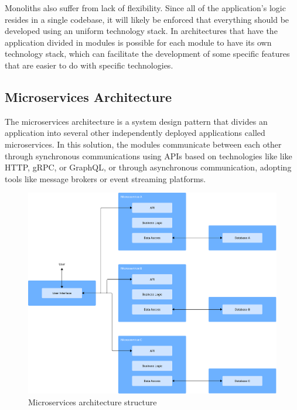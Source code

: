 Monoliths also suffer from lack of flexibility. Since all of the application's
logic resides in a single codebase, it will likely be enforced that everything
should be developed using an uniform technology stack. In architectures that
have the application divided in modules is possible for each module to have
its own technology stack, which can facilitate the development of some specific
features that are easier to do with specific technologies\cite{IBMMonolith}.

\subsection{Microservices Architecture}
The microservices architecture is a system design pattern that divides an
application into several other independently deployed applications called
microservices\cite{7436659}.
In this solution, the modules communicate between each other through
synchronous communications using \gls{API}s based on technologies like like
\gls{HTTP}, \gls{gRPC}, or GraphQL, or through asynchronous communication,
adopting tools like message brokers or event streaming platforms\cite{7436659}.

\begin{figure}[htbp]
	\centering
	\includegraphics[width=\textwidth, height=0.5\textheight, keepaspectratio]{Chapters/Figures/Architectures/microservices.pdf}
	\caption{Microservices architecture structure}
	\label{fig:architectures:microservices}
\end{figure}


